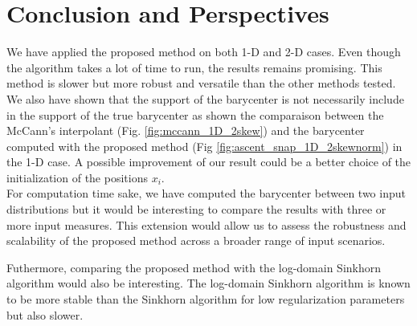 \section{Conclusion and Perspectives}

We have applied the proposed method on both 1-D and 2-D cases. Even though the algorithm takes a lot of time to run, the results remains promising. This method is slower but more robust and versatile than the other methods tested. 
We also have shown that the support of the barycenter is not necessarily include in the support of the true barycenter as shown the comparaison between the McCann's interpolant (Fig. \ref{fig:mccann_1D_2skew}) and the barycenter computed with the proposed method (Fig \ref{fig:ascent_snap_1D_2skewnorm}) in the 1-D case. A possible improvement of our result could be a better choice of the initialization of the positions $x_i$. \\ 

For computation time sake, we have computed the barycenter between two input distributions but it would be interesting to compare the results with three or more input measures. This extension would allow us to assess the robustness and scalability of the proposed method across a broader range of input scenarios. 

Futhermore, comparing the proposed method with the log-domain Sinkhorn algorithm would also be interesting. The log-domain Sinkhorn algorithm is known to be more stable than the Sinkhorn algorithm for low regularization parameters but also slower.
